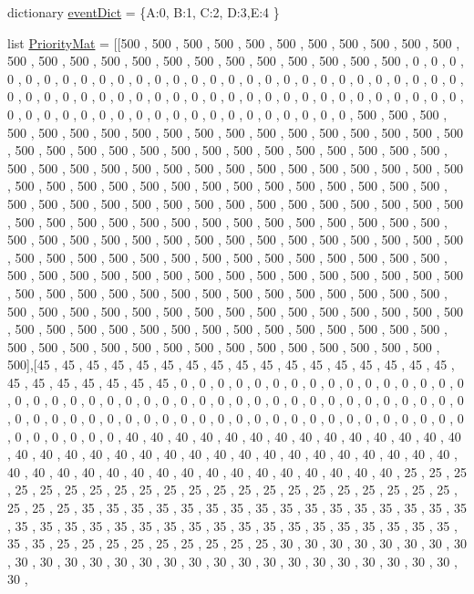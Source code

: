\begin{DoxyCompactItemize}
\item 
dictionary \hyperlink{namespaceTimetable_1_1PrMatScore_ae8c69caafa5a2abe58c7d0633b3919a4}{event\+Dict} = \{\textquotesingle{}A\textquotesingle{}\+:0, \textquotesingle{}B\textquotesingle{}\+:1, \textquotesingle{}C\textquotesingle{}\+:2, \textquotesingle{}D\textquotesingle{}\+:3,\textquotesingle{}E\textquotesingle{}\+:4 \}
\item 
list \hyperlink{namespaceTimetable_1_1PrMatScore_a293eb3ead83ea7f346cfa28ea1d605bb}{Priority\+Mat} = \mbox{[}\mbox{[}500 , 500 , 500 , 500 , 500 , 500 , 500 , 500 , 500 , 500 , 500 , 500 , 500 , 500 , 500 , 500 , 500 , 500 , 500 , 500 , 500 , 500 , 500 , 500 , 0 , 0 , 0 , 0 , 0 , 0 , 0 , 0 , 0 , 0 , 0 , 0 , 0 , 0 , 0 , 0 , 0 , 0 , 0 , 0 , 0 , 0 , 0 , 0 , 0 , 0 , 0 , 0 , 0 , 0 , 0 , 0 , 0 , 0 , 0 , 0 , 0 , 0 , 0 , 0 , 0 , 0 , 0 , 0 , 0 , 0 , 0 , 0 , 0 , 0 , 0 , 0 , 0 , 0 , 0 , 0 , 0 , 0 , 0 , 0 , 0 , 0 , 0 , 0 , 0 , 0 , 0 , 0 , 0 , 0 , 0 , 0 , 500 , 500 , 500 , 500 , 500 , 500 , 500 , 500 , 500 , 500 , 500 , 500 , 500 , 500 , 500 , 500 , 500 , 500 , 500 , 500 , 500 , 500 , 500 , 500 , 500 , 500 , 500 , 500 , 500 , 500 , 500 , 500 , 500 , 500 , 500 , 500 , 500 , 500 , 500 , 500 , 500 , 500 , 500 , 500 , 500 , 500 , 500 , 500 , 500 , 500 , 500 , 500 , 500 , 500 , 500 , 500 , 500 , 500 , 500 , 500 , 500 , 500 , 500 , 500 , 500 , 500 , 500 , 500 , 500 , 500 , 500 , 500 , 500 , 500 , 500 , 500 , 500 , 500 , 500 , 500 , 500 , 500 , 500 , 500 , 500 , 500 , 500 , 500 , 500 , 500 , 500 , 500 , 500 , 500 , 500 , 500 , 500 , 500 , 500 , 500 , 500 , 500 , 500 , 500 , 500 , 500 , 500 , 500 , 500 , 500 , 500 , 500 , 500 , 500 , 500 , 500 , 500 , 500 , 500 , 500 , 500 , 500 , 500 , 500 , 500 , 500 , 500 , 500 , 500 , 500 , 500 , 500 , 500 , 500 , 500 , 500 , 500 , 500 , 500 , 500 , 500 , 500 , 500 , 500 , 500 , 500 , 500 , 500 , 500 , 500 , 500 , 500 , 500 , 500 , 500 , 500 , 500 , 500 , 500 , 500 , 500 , 500 , 500 , 500 , 500 , 500 , 500 , 500 , 500 , 500 , 500 , 500 , 500 , 500 , 500 , 500 , 500 , 500 , 500 , 500 , 500 , 500 , 500 , 500 , 500 , 500 , 500 , 500 , 500 , 500 , 500 , 500\mbox{]},\mbox{[}45 , 45 , 45 , 45 , 45 , 45 , 45 , 45 , 45 , 45 , 45 , 45 , 45 , 45 , 45 , 45 , 45 , 45 , 45 , 45 , 45 , 45 , 45 , 45 , 0 , 0 , 0 , 0 , 0 , 0 , 0 , 0 , 0 , 0 , 0 , 0 , 0 , 0 , 0 , 0 , 0 , 0 , 0 , 0 , 0 , 0 , 0 , 0 , 0 , 0 , 0 , 0 , 0 , 0 , 0 , 0 , 0 , 0 , 0 , 0 , 0 , 0 , 0 , 0 , 0 , 0 , 0 , 0 , 0 , 0 , 0 , 0 , 0 , 0 , 0 , 0 , 0 , 0 , 0 , 0 , 0 , 0 , 0 , 0 , 0 , 0 , 0 , 0 , 0 , 0 , 0 , 0 , 0 , 0 , 0 , 0 , 40 , 40 , 40 , 40 , 40 , 40 , 40 , 40 , 40 , 40 , 40 , 40 , 40 , 40 , 40 , 40 , 40 , 40 , 40 , 40 , 40 , 40 , 40 , 40 , 40 , 40 , 40 , 40 , 40 , 40 , 40 , 40 , 40 , 40 , 40 , 40 , 40 , 40 , 40 , 40 , 40 , 40 , 40 , 40 , 40 , 40 , 40 , 40 , 25 , 25 , 25 , 25 , 25 , 25 , 25 , 25 , 25 , 25 , 25 , 25 , 25 , 25 , 25 , 25 , 25 , 25 , 25 , 25 , 25 , 25 , 25 , 25 , 35 , 35 , 35 , 35 , 35 , 35 , 35 , 35 , 35 , 35 , 35 , 35 , 35 , 35 , 35 , 35 , 35 , 35 , 35 , 35 , 35 , 35 , 35 , 35 , 35 , 35 , 35 , 35 , 35 , 35 , 35 , 35 , 35 , 35 , 35 , 35 , 25 , 25 , 25 , 25 , 25 , 25 , 25 , 25 , 25 , 30 , 30 , 30 , 30 , 30 , 30 , 30 , 30 , 30 , 30 , 30 , 30 , 30 , 30 , 30 , 30 , 30 , 30 , 30 , 30 , 30 , 30 , 30 , 30 , 30 , 30 , 30 , 
\end{DoxyCompactItemize}
